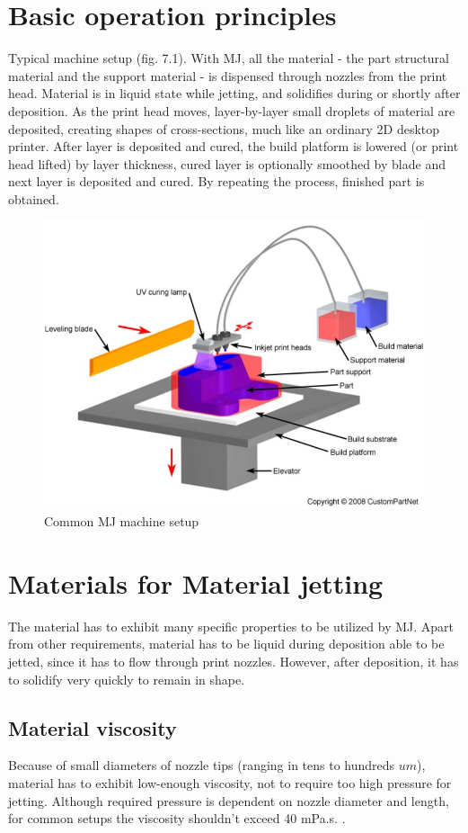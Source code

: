 \documentclass[a4paper, twoside, 11pt]{report}
\begin{document}
\section{Basic operation principles}
Typical machine setup (fig. 7.1). With MJ, all the material - the part structural material and the support material - is dispensed through nozzles from the print head. Material is in liquid state while jetting, and solidifies during or shortly after deposition.  As the print head moves, layer-by-layer small droplets of material are deposited, creating shapes of cross-sections, much like an ordinary 2D desktop printer. After layer is deposited and cured, the build platform is lowered (or print head lifted) by layer thickness, cured layer is optionally smoothed by blade and next layer is deposited and cured. By repeating the process, finished part is obtained.
\begin{figure}[b!]
	\centering
	\includegraphics[scale=0.8]{MJmachine}
	\caption{Common MJ machine setup \cite{custompart}}
\end{figure}

\section{Materials for Material jetting}
The material has to exhibit many specific properties to be utilized by MJ. Apart from other requirements, material has to be liquid during deposition able to be jetted, since it has to flow through print nozzles. However, after deposition, it has to solidify very quickly to remain in shape.

\subsection{Material viscosity}
Because of small diameters of nozzle tips (ranging in tens to hundreds $um$), material has to exhibit low-enough viscosity, not to require too high pressure for jetting. Although required pressure is dependent on nozzle diameter and length, for common setups the viscosity shouldn't exceed 40 mPa.s. \cite[p. 176]{AMT}.
\end{document}
